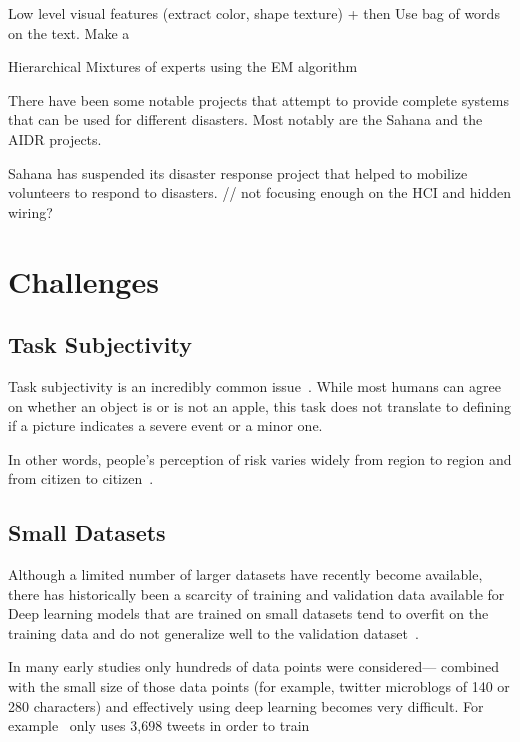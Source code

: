   Low level visual features (extract color, shape texture) + then Use bag of words
  on the text. Make a~\cite{jomaaSemanticVisualCues2016}

  Hierarchical Mixtures of experts using the EM
  algorithm~\cite{jordanHierarchicalMixturesExperts1994} 
  
  There have been some notable projects that attempt to provide complete systems
  that can be used for different disasters. Most notably are the Sahana and the
  AIDR projects.
  
  Sahana has suspended its disaster response project that helped to
  mobilize volunteers to respond to disasters.
  // not focusing enough on the HCI and hidden wiring?


\section{Challenges}
\subsection{Task Subjectivity}
Task subjectivity is an incredibly common
issue~\cite{nguyenDamageAssessmentSocial2017,
quarantelliUrbanVulnerabilityDisasters2003}. While most humans can agree on
whether an object is or is not an apple, this task does not translate to
defining if a picture indicates a severe event or a minor one. 

In other words, people's perception of risk varies widely from region to region
and from citizen to citizen~\cite{quarantelliUrbanVulnerabilityDisasters2003}.

\subsection{Small Datasets}
Although a limited number of larger datasets have recently become available, there has
historically been a scarcity of training and validation data available for
Deep learning models that are trained on small datasets tend to overfit on the
training data and do not generalize well to the validation
dataset~\cite{perezEffectivenessDataAugmentation2017,nguyenRapidClassificationCrisisRelated}.

In many early studies only hundreds of data points were considered--- combined
with the small size of those data points (for example, twitter microblogs of
140 or 280 characters) and effectively using deep learning becomes very
difficult.
For example~\cite{nagyCrowdSentimentDetection2012} only uses 3,698 tweets in
order to train 

